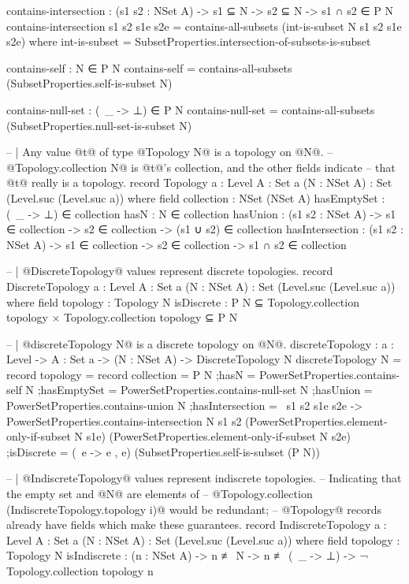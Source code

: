 \begin{code}
  contains-intersection : (s1 s2 : NSet A) ->
                          s1 ⊆ N ->
                          s2 ⊆ N ->
                          s1 ∩ s2 ∈ P N
  contains-intersection s1 s2 s1e s2e = contains-all-subsets (int-is-subset N s1 s2 s1e s2e)
    where
    int-is-subset = SubsetProperties.intersection-of-subsets-is-subset

  contains-self : N ∈ P N
  contains-self = contains-all-subsets (SubsetProperties.self-is-subset N)

  contains-null-set : (\ _ -> ⊥) ∈ P N
  contains-null-set = contains-all-subsets (SubsetProperties.null-set-is-subset N)

-- | Any value @t@ of type @Topology N@ is a topology on @N@.
-- @Topology.collection N@ is @t@'s collection, and the other fields indicate
-- that @t@ really is a topology.
record Topology {a : Level}
                {A : Set a}
                (N : NSet A) : Set (Level.suc (Level.suc a)) where
  field
    collection : NSet (NSet A)
    hasEmptySet : (\ _ -> ⊥) ∈ collection
    hasN : N ∈ collection
    hasUnion : (s1 s2 : NSet A) ->
               s1 ∈ collection ->
               s2 ∈ collection ->
               (s1 ∪ s2) ∈ collection
    hasIntersection : (s1 s2 : NSet A) ->
                      s1 ∈ collection ->
                      s2 ∈ collection ->
                      s1 ∩ s2 ∈ collection

-- | @DiscreteTopology@ values represent discrete topologies.
record DiscreteTopology {a : Level}
                        {A : Set a}
                        (N : NSet A) : Set (Level.suc (Level.suc a)) where
  field
    topology : Topology N
    isDiscrete : P N ⊆ Topology.collection topology ×
                 Topology.collection topology ⊆ P N

-- | @discreteTopology N@ is a discrete topology on @N@.
discreteTopology : {a : Level} -> {A : Set a} -> (N : NSet A) -> DiscreteTopology N
discreteTopology N = record
  {topology = record
     {collection = P N
     ;hasN = PowerSetProperties.contains-self N
     ;hasEmptySet = PowerSetProperties.contains-null-set N
     ;hasUnion = PowerSetProperties.contains-union N
     ;hasIntersection = \ s1 s2 s1e s2e ->
       PowerSetProperties.contains-intersection
         N s1 s2
         (PowerSetProperties.element-only-if-subset N s1e)
         (PowerSetProperties.element-only-if-subset N s2e)
     }
  ;isDiscrete = (\ e -> e , e) (SubsetProperties.self-is-subset (P N))}

-- | @IndiscreteTopology@ values represent indiscrete topologies.
-- Indicating that the empty set and @N@ are elements of
-- @Topology.collection (IndiscreteTopology.topology i)@ would be redundant;
-- @Topology@ records already have fields which make these guarantees.
record IndiscreteTopology {a : Level}
                          {A : Set a}
                          (N : NSet A) : Set (Level.suc (Level.suc a)) where
  field
    topology : Topology N
    isIndiscrete : (n : NSet A) ->
                   n ≢ N ->
                   n ≢ (\ _ -> ⊥)
                   -> ¬ Topology.collection topology n


\end{code}
